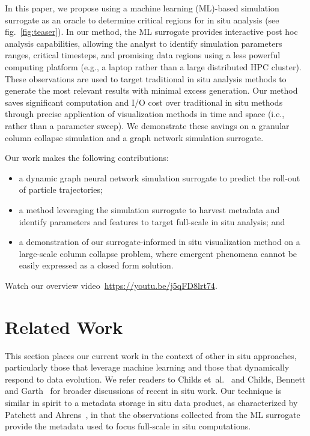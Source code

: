 \documentclass{vgtc}
\begin{document}
In this paper, we propose using a machine learning (ML)-based simulation surrogate as an oracle to determine critical regions for in situ analysis (see fig.~\ref{fig:teaser}). In our method, the ML surrogate provides interactive post hoc analysis capabilities, allowing the analyst to identify simulation parameters ranges, critical timesteps, and promising data regions using a less powerful computing platform (e.g., a laptop rather than a large distributed HPC cluster).  These observations are used to target traditional in situ analysis methods to generate the most relevant results with minimal excess generation. Our method saves significant computation and I/O cost over traditional in situ methods through precise application of visualization methods in time and space (i.e., rather than a parameter sweep). We demonstrate these savings on a granular column collapse simulation and a graph network simulation surrogate.

Our work makes the following contributions: 
\begin{itemize}
    \item a dynamic graph neural network simulation surrogate to predict the roll-out of particle trajectories;
    \item a method leveraging the simulation surrogate to harvest metadata and identify parameters and features to target full-scale in situ analysis; and
    \item a demonstration of our surrogate-informed in situ visualization method on a large-scale column collapse problem, where emergent phenomena cannot be easily expressed as a closed form solution.
\end{itemize}

\noindent Watch our overview video~\url{https://youtu.be/j5qFD8lrt74}.

\section{Related Work}
\label{sec:related}

This section places our current work in the context of other in situ approaches, particularly those that leverage machine learning and those that dynamically respond to data evolution. We refer readers to Childs et~al.~\cite{childs20insitu} and Childs, Bennett and Garth~\cite{childs22insitu} for broader discussions of recent in situ work. Our technique is similar in spirit to a metadata storage in situ data product, as characterized by Patchett and Ahrens~\cite{patchett18optimizing}, in that the observations collected from the ML surrogate provide the metadata used to focus full-scale in situ computations.
\end{document}
